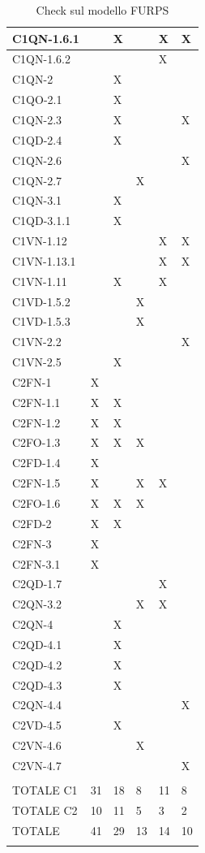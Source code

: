 \begin{footnotesize}
\begin{longtable}{|p{}|p{}|p{}|p{}|p{}|p{}|}
 C1QN-1.6.1& &  X&  &  X&  X\\ \hline
 C1QN-1.6.2& &  &  &  X&  \\ \hline
 C1QN-2& &  X&  &  &  \\ \hline
 C1QO-2.1& &  X&  &  &  \\ \hline
 C1QN-2.3& &  X&  &  &  X\\ \hline
 C1QD-2.4& &  X&  &  &  \\ \hline
 C1QN-2.6& &  &  &  &  X\\ \hline
 C1QN-2.7& &  &  X&  &  \\ \hline
 C1QN-3.1& &  X&  &  &  \\ \hline
 C1QD-3.1.1& &  X&  &  &  \\ \hline
 C1VN-1.12& &  &  &  X&  X\\ \hline
 C1VN-1.13.1& &  &  &  X&  X\\ \hline
 C1VN-1.11& &  X&  &  X&  \\ \hline
 C1VD-1.5.2& &  &  X&  &  \\ \hline
 C1VD-1.5.3& &  &  X&  &  \\ \hline
 C1VN-2.2& &  &  &  &  X\\ \hline
 C1VN-2.5& &  X&  &  &  \\ \hline
 C2FN-1& X&  &  &  &  \\ \hline
 C2FN-1.1& X&  X&  &  &  \\ \hline
 C2FN-1.2& X&  X&  &  &  \\ \hline
 C2FO-1.3& X&  X&  X&  &  \\ \hline
 C2FD-1.4& X&  &  &  &  \\ \hline
 C2FN-1.5& X&  &  X&  X&  \\ \hline
 C2FO-1.6& X&  X&  X&  &  \\ \hline
 C2FD-2& X&  X&  &  &  \\ \hline
 C2FN-3& X&  &  &  &  \\ \hline
 C2FN-3.1& X&  &  &  &  \\ \hline
 C2QD-1.7& &  &  &  X&  \\ \hline
 C2QN-3.2& &  &  X&  X&  \\ \hline
 C2QN-4& &  X&  &  &  \\ \hline
 C2QD-4.1& &  X&  &  &  \\ \hline
 C2QD-4.2& &  X&  &  &  \\ \hline
 C2QD-4.3& &  X&  &  &  \\ \hline
 C2QN-4.4& &  &  &  &  X\\ \hline
 C2VD-4.5& &  X&  &  &  \\ \hline
 C2VN-4.6& &  &  X&  &  \\ \hline
 C2VN-4.7& &  &  &  &  X\\ \hline
         & &  &  &  &  \\ \hline
 TOTALE C1& 31&  18&  8&  11&  8\\ \hline
 TOTALE C2& 10&  11&  5&  3&  2\\ \hline
 TOTALE& 41&  29&  13&  14&  10\\ \hline
\caption{Check sul modello FURPS}
\end{longtable}
\end{footnotesize}

